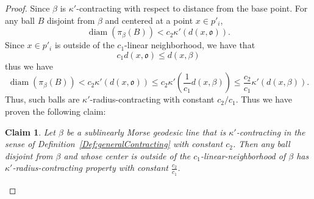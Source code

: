 \documentclass[12 pt]{amsart}
\newcommand{\gothic}{\mathfrak}
\newcommand{\go}{{\gothic o}}
\newtheorem{claim}[theorem]{Claim}
\theoremstyle{definition}
\theoremstyle{remark}
\DeclareMathOperator{\diam}{diam}
\begin{document}
\begin{proof}
  Since $\beta$ is $\kappa'$-contracting with respect to distance from the base point. For any ball $B$ disjoint from $\beta$ and centered at a point $x \in p'_i$, 
  \begin{equation}\label{contractingball}
  \diam(\pi_\beta(B)) < c_2 \kappa'(d(x, \go)).
  \end{equation}
  Since $x \in p'_i$ is outside of the $c_1$-linear neighborhood, we have that
  \[ c_1 d(x, \go) \leq d(x, \beta)  \]
  thus we have
  \[\diam(\pi_\beta(B)) < c_2 \kappa'(d(x, \go))
\leq c_2 \kappa'(\frac{1} {c_1} d(x, \beta))\leq \frac{c_2}{c_1} \kappa'(d(x, \beta)).\]
Thus, such balls are $\kappa'$-radius-contracting with constant $c_2/c_1$. Thus we have proven the following claim:
\begin{claim}\label{radial-contracting}
Let $\beta$ be a sublinearly Morse geodesic line that is 
$\kappa'$-contracting in the sense of Definition~\ref{Def:generalContracting} with constant $c_2$. Then any ball disjoint from $\beta$ and whose center is outside of the $c_1$-linear-neighborhood of $\beta$ has $\kappa'$-radius-contracting property with constant $\frac{c_2}{c_1}$.
\end{claim}

\begin{figure}
    \centering
{} %

\begin{tikzpicture}[x=0.75pt,y=0.75pt,yscale=-1,xscale=1]


\end{tikzpicture}
\end{figure}
\end{proof}
\end{document}
